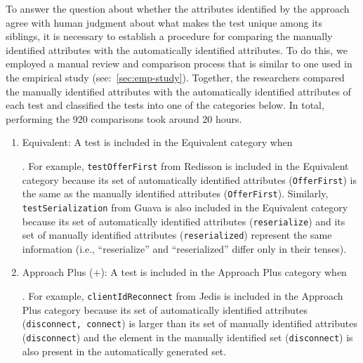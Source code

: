 To answer the question about whether the attributes identified by the approach agree with human judgment about what makes the test unique among its siblings, it is necessary to establish a procedure for comparing the manually identified attributes with the automatically identified attributes.
%
To do this, we employed a manual review and comparison process that is similar to one used in the empirical study (see:~\cref{sec:emp-study}).
%
Together, the researchers compared the manually identified attributes with the automatically identified attributes of each test and classified the tests into one of the categories below.
%
In total, performing the \num{920} comparisons took around \num{20} hours.

\begin{enumerate}
    \item Equivalent: A test is included in the Equivalent category when 
    .
    For example, \texttt{test\-Offer\-First} from Redisson is included in the Equivalent category because its set of automatically identified attributes (\texttt{Offer\-First}) is the same as the manually identified attributes (\texttt{Offer\-First}).
    Similarly, \texttt{test\-Serialization} from Guava is also included in the Equivalent category because its set of automatically identified attributes (\texttt{reserialize}) and its set of manually identified attributes (\texttt{reserialized}) represent the same information (i.e., \enquote{reserialize} and \enquote{reserialized} differ only in their tenses).
    
    \item Approach Plus ($\boldsymbol{+}$): A test is included in the Approach Plus category when
    .
    For example, \texttt{client\-Id\-Reconnect} from Jedis is included in the Approach Plus category because its set of automatically identified attributes (\texttt{disconnect, connect}) is larger than its set of manually identified attributes (\texttt{disconnect}) and the element in the manually identified set (\texttt{disconnect}) is also present in the automatically generated set.
    

\end{enumerate}

